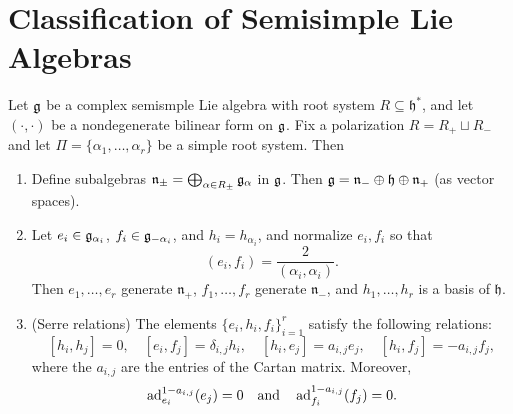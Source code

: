 \section{Classification of Semisimple Lie Algebras}

\begin{theorem}
  Let $\mathfrak{g}$ be a complex semismple
  Lie algebra with root system
  $R \subseteq \mathfrak{h}^*$, and
  let $(\cdot, \cdot)$ be a
  nondegenerate bilinear form
  on $\mathfrak{g}$. Fix a polarization
  $R = R_+ \sqcup R_-$ and let
  $\Pi = \{\alpha_1, \dots, \alpha_r\}$
  be a simple root system. Then
  \begin{enumerate}
    \item Define subalgebras
      $\mathfrak{n}_{\pm} = \bigoplus_{\alpha \in R_{\pm}} \mathfrak{g}_\alpha$
      in $\mathfrak{g}$. Then
      $\mathfrak{g} = \mathfrak{n}_- \oplus \mathfrak{h} \oplus \mathfrak{n}_+$
      (as vector spaces).
    \item Let $e_i \in \mathfrak{g}_{\alpha_i}$,
      $f_i \in \mathfrak{g}_{-\alpha_i}$, and
      $h_i = h_{\alpha_i}$, and
      normalize $e_i, f_i$ so that
      \[
        (e_i, f_i) = \frac{2}{(\alpha_i, \alpha_i)}.
      \] 
      Then $e_1, \dots, e_r$
      generate $\mathfrak{n}_+$,
      $f_1, \dots, f_r$ generate
      $\mathfrak{n}_-$, and
      $h_1, \dots, h_r$ is a basis
      of $\mathfrak{h}$.
    \item (Serre relations)
      The elements
      $\{e_i, h_i, f_i\}_{i = 1}^r$
      satisfy the following relations:
      \[
        [h_i, h_j] = 0, \quad
        [e_i, f_j] = \delta_{i, j} h_i,
        \quad
        [h_i, e_j] = a_{i, j} e_j,
        \quad [h_i, f_j] = -a_{i, j} f_j,
      \]
      where the $a_{i, j}$ are the
      entries of the Cartan matrix.
      Moreover,
      \[
        \operatorname{ad}_{e_i}^{1 - a_{i, j}}(e_j) = 0 \quad \text{and} \quad
        \operatorname{ad}_{f_i}^{1 - a_{i, j}}(f_j) = 0.
      \]
  \end{enumerate}
\end{theorem}


